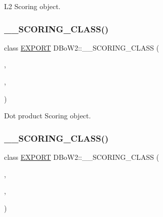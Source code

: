 L2 Scoring object. 

\mbox{\label{namespace_d_bo_w2_a8b3715c76bccab82aa18804b6b7dc1ba}} 
\subsubsection{\texorpdfstring{\+\_\+\+\_\+\+S\+C\+O\+R\+I\+N\+G\+\_\+\+C\+L\+A\+S\+S()}{\_\_SCORING\_CLASS()}\hspace{0.1cm}{\footnotesize\ttfamily [3/6]}}
{\footnotesize\ttfamily class \mbox{\hyperlink{_d_bo_w2_2_d_utils_2config_8h_a3472d8cdbb788d5f1815b3522595bc49}{E\+X\+P\+O\+RT}} D\+Bo\+W2\+::\+\_\+\+\_\+\+S\+C\+O\+R\+I\+N\+G\+\_\+\+C\+L\+A\+SS (\begin{DoxyParamCaption}\item[{Dot\+Product\+Scoring}]{,  }\item[{false}]{,  }\item[{\mbox{\hyperlink{namespace_d_bo_w2_a53e9e0bcfc25c861815e413a7cf3fa51a94f5879ff083c0a8364805ae4f9c2d5c}{L1}}}]{ }\end{DoxyParamCaption})}



Dot product Scoring object. 

\mbox{\label{namespace_d_bo_w2_a7135fab6a887afb7d2b4e6254b4875ea}} 
\subsubsection{\texorpdfstring{\+\_\+\+\_\+\+S\+C\+O\+R\+I\+N\+G\+\_\+\+C\+L\+A\+S\+S()}{\_\_SCORING\_CLASS()}\hspace{0.1cm}{\footnotesize\ttfamily [4/6]}}
{\footnotesize\ttfamily class \mbox{\hyperlink{_d_bo_w2_2_d_utils_2config_8h_a3472d8cdbb788d5f1815b3522595bc49}{E\+X\+P\+O\+RT}} D\+Bo\+W2\+::\+\_\+\+\_\+\+S\+C\+O\+R\+I\+N\+G\+\_\+\+C\+L\+A\+SS (\begin{DoxyParamCaption}\item[{Bhattacharyya\+Scoring}]{,  }\item[{true}]{,  }\item[{\mbox{\hyperlink{namespace_d_bo_w2_a53e9e0bcfc25c861815e413a7cf3fa51a94f5879ff083c0a8364805ae4f9c2d5c}{L1}}}]{ }\end{DoxyParamCaption})}



